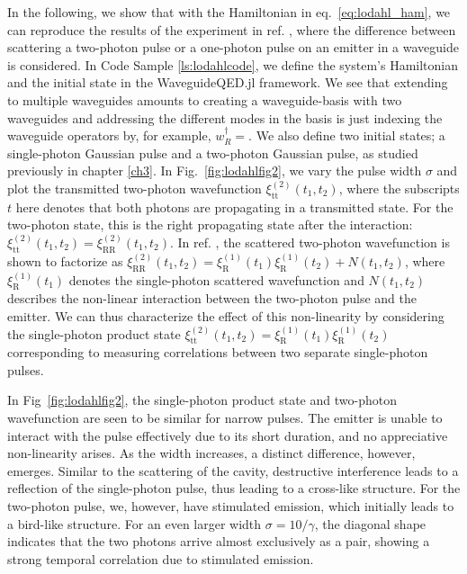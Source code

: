 In the following, we show that with the Hamiltonian in eq.~\eqref{eq:lodahl_ham}, we can reproduce the results of the experiment in ref. \cite{LeJeannic2022DynamicalEmitter}, where the difference between scattering a two-photon pulse or a one-photon pulse on an emitter in a waveguide is considered. In Code Sample \ref{ls:lodahlcode}, we define the system's Hamiltonian and the initial state in the WaveguideQED.jl framework. We see that extending to multiple waveguides amounts to creating a waveguide-basis with two waveguides  and addressing the different modes in the basis is just indexing the waveguide operators by, for example, $w^\dagger_R = $.
We also define two initial states; a single-photon Gaussian pulse and a two-photon Gaussian pulse, as studied previously in chapter \ref{ch3}. In Fig.~\ref{fig:lodahlfig2}, we vary the pulse width $\sigma$ and plot the transmitted two-photon wavefunction $\xi_{\mathrm{tt}}^{(2)}(t_1,t_2)$, where the subscripts $t$ here denotes that both photons are propagating in a transmitted state. For the two-photon state, this is the right propagating state after the interaction: $\xi_{\mathrm{tt}}^{(2)}(t_1,t_2) = \xi_{\mathrm{RR}}^{(2)}(t_1,t_2)$. In ref. \cite{LeJeannic2022DynamicalEmitter}, the scattered two-photon wavefunction is shown to factorize as $\xi_{\mathrm{RR}}^{(2)}(t_1,t_2) = \xi_\mathrm{R}^{(1)}(t_1)\xi_\mathrm{R}^{(1)}(t_2) + N(t_1,t_2)$, where $\xi_\mathrm{R}^{(1)}(t_1)$ denotes the single-photon scattered wavefunction and $N(t_1,t_2)$ describes the non-linear interaction between the two-photon pulse and the emitter. We can thus characterize the effect of this non-linearity by considering the single-photon product state 
 $\xi_{\mathrm{tt}}^{(2)}(t_1,t_2) = \xi_\mathrm{R}^{(1)}(t_1)\xi_\mathrm{R}^{(1)}(t_2)$ corresponding to measuring correlations between two separate single-photon pulses. 



In Fig~\ref{fig:lodahlfig2}, the single-photon product state and two-photon wavefunction are seen to be similar for narrow pulses. The emitter is unable to interact with the pulse effectively due to its short duration, and no appreciative non-linearity arises. As the width increases, a distinct difference, however, emerges. Similar to the scattering of the cavity, destructive interference leads to a reflection of the single-photon pulse, thus leading to a cross-like structure. For the two-photon pulse, we, however, have stimulated emission, which initially leads to a bird-like structure. For an even larger width $\sigma = 10/\gamma$, the diagonal shape indicates that the two photons arrive almost exclusively as a pair, showing a strong temporal correlation due to stimulated emission. 

